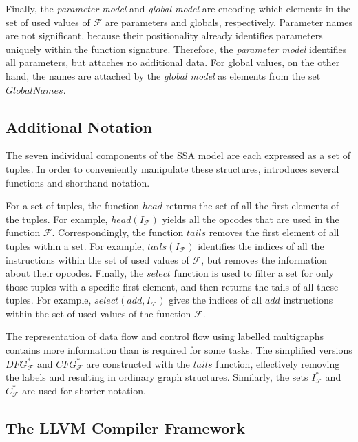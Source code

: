     Finally, the {\it parameter model} and {\it global model} are encoding which
    elements in the set of used values of $\mathcal F$ are parameters and
    globals, respectively.
    Parameter names are not significant, because their positionality
    already identifies parameters uniquely within the function signature.
    Therefore, the {\it parameter model} identifies all parameters, but attaches
    no additional data.
    For global values, on the other hand, the names are attached by the
    {\it global model} as elements from the set $GlobalNames$.

\subsection{Additional Notation}

    The seven individual components of the SSA model are each expressed as a
    set of tuples.
    In order to conveniently manipulate these structures, 
     introduces several functions and shorthand notation.

    For a set of tuples, the function $head$ returns the set of all the first
    elements of the tuples.
    For example, $head(I_\mathcal F)$ yields all the opcodes that are used in
    the function $\mathcal F$.
    Correspondingly, the function $tails$ removes the first element of all
    tuples within a set.
    For example, $tails(I_\mathcal F)$ identifies the indices of all the
    instructions within the set of used values of $\mathcal F$, but removes the
    information about their opcodes.
    Finally, the $select$ function is used to filter a set for only those tuples
    with a specific first element, and then returns the tails of all these
    tuples.
    For example, $select(add,I_\mathcal F)$ gives the indices of all $add$
    instructions within the set of used values of the function $\mathcal F$.

    The representation of data flow and control flow using labelled multigraphs
    contains more information than is required for some tasks.
    The simplified versions $DFG_\mathcal F^*$ and $CFG_\mathcal F^*$ are
    constructed with the $tails$ function, effectively removing the labels and
    resulting in ordinary graph structures.
    Similarly, the sets $I_\mathcal F^*$ and $C_\mathcal F^*$ are used for
    shorter notation.

\subsection{The LLVM Compiler Framework}

